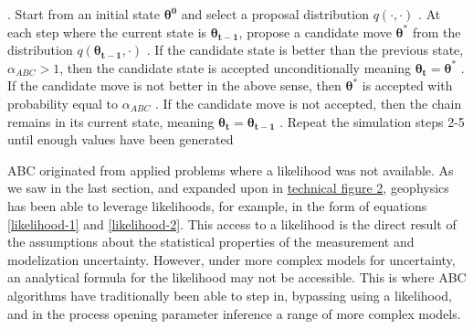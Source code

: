 \begin{algorithm}[H]
	\caption{ }
	\begin{algorithmic}
		. Start from an initial state $\bm{\theta^0}$ and select a proposal distribution $q(\cdot,\cdot)$
		. At each step where the current state is $\bm{\theta_{t-1}}$, propose a candidate 	move $\bm{\theta^*}$ from the distribution $q(\bm{\theta_{t-1}},\cdot)$		
		. If the candidate state is better than the previous state, $\alpha_{ABC} > 1$, then the candidate state is accepted unconditionally meaning $\bm{\theta_t} = \bm{\theta^*}$
		. If the candidate move is not better in the above sense, then $\bm{\theta^*}$ is accepted with probability equal to $\alpha_{ABC}$		
		. If the candidate move is not accepted, then the chain remains in its current state, meaning $\bm{\theta_{t}} = \bm{\theta_{t-1}}$		
		. Repeat the simulation steps 2-5 until enough values have been generated
	\end{algorithmic}
	\label{ABC-MCMC}
\end{algorithm}

ABC originated from applied problems where a likelihood was not available. As we saw in the last section, and expanded upon in \hyperref[tf2]{technical figure 2}, geophysics has been able to leverage likelihoods, for example, in the form of equations \ref{likelihood-1} and \ref{likelihood-2}. This access to a likelihood is the direct result of the assumptions about the statistical properties of the measurement and modelization uncertainty. However, under more complex models for uncertainty, an analytical formula for the likelihood may not be accessible. This is where ABC algorithms have traditionally been able to step in, bypassing using a likelihood, and in the process opening parameter inference a range of more complex models. \par


